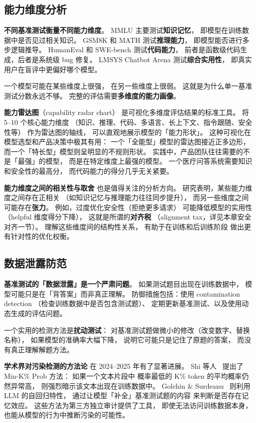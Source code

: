 \subsection{能力维度分析}

\textbf{不同基准测试衡量不同能力维度}。
MMLU 主要测试\textbf{知识记忆}，
即模型在训练数据中是否见过相关知识。
GSM8K 和 MATH 测试\textbf{推理能力}，
即模型能否进行多步逻辑推导。
HumanEval 和 SWE-bench 测试\textbf{代码能力}，
前者是函数级代码生成，后者是系统级 bug 修复。
LMSYS Chatbot Arena 测试\textbf{综合实用性}，
即真实用户在盲评中更偏好哪个模型。

一个模型可能在某些维度上很强，
在另一些维度上很弱。
这就是为什么单一基准测试分数永远不够。
完整的评估需要\textbf{多维度的能力画像}。

\textbf{能力雷达图}（capability radar chart）
是可视化多维度评估结果的标准工具。
将 5--10 个核心能力维度
（知识、推理、代码、多语言、长上下文、指令跟随、安全性等）
作为雷达图的轴线，
可以直观地展示模型的「能力形状」。
这种可视化在模型选型和产品决策中极其有用：
一个「全能型」模型的雷达图接近正多边形，
而一个「特长型」模型则呈明显的不规则形状。
实践中，产品团队往往需要的不是「最强」的模型，
而是在特定维度上最强的模型。
一个医疗问答系统需要知识和安全性的最高分，
而代码能力的得分几乎无关紧要。

\textbf{能力维度之间的相关性与取舍}
也是值得关注的分析方向。
研究表明，某些能力维度之间存在正相关
（如知识记忆与推理能力往往同步提升），
而另一些维度之间可能存在\textbf{张力}。
例如，过度优化安全性（拒绝更多请求）
可能降低模型的实用性（helpful 维度得分下降），
这就是所谓的\textbf{对齐税}
（alignment tax，详见本章安全对齐一节）。
理解这些维度间的结构性关系，
有助于在训练和后训练阶段
做出更有针对性的优化权衡。

\subsection{数据泄露防范}

\textbf{基准测试的「数据泄露」是一个严肃问题}。
如果测试题目出现在训练数据中，
模型可能只是在「背答案」而非真正理解。
防御措施包括：使用 contamination detection
（检查训练数据中是否包含测试题）、
定期更新基准测试、以及使用动态生成的评估问题。

一个实用的检测方法是\textbf{扰动测试}：
对基准测试题做微小的修改（改变数字、替换名称），
如果模型的准确率大幅下降，
说明它可能只是记住了原题的答案，
而没有真正理解解题方法。

\textbf{学术界对污染检测的方法论}
在 2024--2025 年有了显著进展。
Shi 等人~\cite{shi2024detecting}
提出了 Min-K\% Prob 方法：
如果一个文本片段中
概率最低的 K\% token 的平均概率仍然异常高，
则强烈暗示该文本出现在训练数据中。
Golchin \& Surdeanu~\cite{golchin2024time}
则利用 LLM 的自回归特性，
通过让模型「补全」基准测试题的内容
来判断是否存在记忆效应。
这些方法为第三方独立审计提供了工具，
即使无法访问训练数据本身，
也能从模型的行为中推断污染的可能性。

